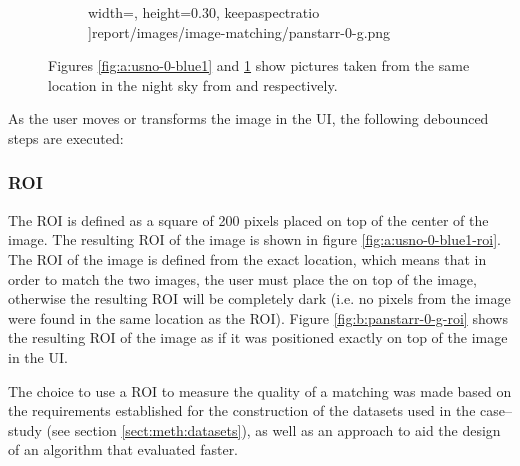 \begin{figure}[H]
\begin{subfigure}{.5\textwidth}
            width=\textwidth,
            height=0.30\textheight,
            keepaspectratio
      ]{report/images/image-matching/panstarr-0-g.png}
      \caption{\panstarrs}
      \label{fig:b:panstarr-0-g}
    \end{subfigure}
    \caption{Figures \ref{fig:a:usno-0-blue1} and \ref{fig:b:panstarr-0-g} show pictures taken from the same location in the night sky from \usno and \panstarrs respectively.}
    \label{fig:mission-0}
\end{figure}

As the user moves or transforms the \panstarrs image in the UI, the following debounced steps are executed:

\subsubsection{ROI} \label{subsubsect:case-study:impl:roi}

The ROI is defined as a square of 200 pixels placed on top of the center of the \usno image. The resulting ROI of the \usno image is shown in figure \ref{fig:a:usno-0-blue1-roi}. The ROI of the \panstarrs image is defined from the exact location, which means that in order to match the two images, the user must place the \panstarrs on top of the \usno image, otherwise the resulting ROI will be completely dark (i.e. no pixels from the \panstarrs image were found in the same location as the \usno ROI). Figure \ref{fig:b:panstarr-0-g-roi} shows the resulting ROI of the \panstarrs image as if it was positioned exactly on top of the \usno image in the UI. \newline

The choice to use a ROI to measure the quality of a matching was made based on the requirements established for the construction of the datasets used in the case--study (see section \ref{sect:meth:datasets}), as well as an approach to aid the design of an algorithm that evaluated faster.

